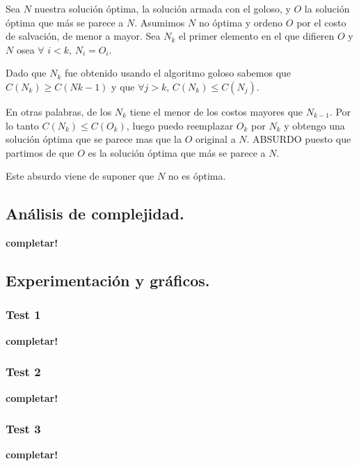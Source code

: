 Sea $N$ nuestra solución óptima, la solución armada con el goloso, y $O$ la solución óptima que más se parece a $N$. Asumimos $N$ no óptima y ordeno $O$ por el costo de salvación, de menor a mayor.
Sea $N_{k}$ el primer elemento en el que difieren $O$ y $N$ osea $\forall$ $i<k$, $N_{i}=O_{i}$.

Dado que $N_{k}$ fue obtenido usando el algoritmo goloso sabemos que $C(N_{k}) \geq C(N{k-1})$ y que $\forall j>k$, $C(N_{k})\leq C(N_{j})$.

En otras palabras, de los $N_{k}$ tiene el menor de los costos mayores que $N_{k-1}$. Por lo tanto $C(N_{k})\leq C(O_{k})$, luego puedo reemplazar $O_{k}$ por $N_{k}$ y obtengo una solución óptima que se parece mas que la $O$ original a $N$. ABSURDO puesto que partimos de que $O$ es la solución óptima que más se parece a $N$.

Este absurdo viene de suponer que $N$ no es óptima.





\newpage
\subsection{Análisis de complejidad.}

\vspace*{0.3cm}

\textbf{completar!}



\newpage
\subsection{Experimentación y gráficos.}

\vspace*{0.3cm}

\subsubsection{Test 1}

\vspace*{0.3cm}

\textbf{completar!}


\newpage
\subsubsection{Test 2}

\vspace*{0.3cm}

\textbf{completar!}


\newpage
\subsubsection{Test 3}

\vspace*{0.3cm}

\textbf{completar!}
